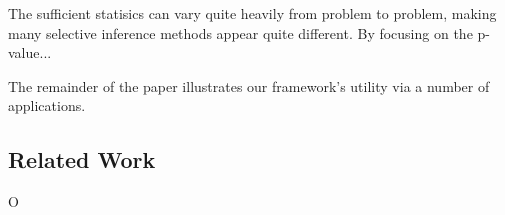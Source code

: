 \documentclass{article}
\begin{document}
The sufficient statisics can vary quite heavily from problem to problem, making many selective inference methods appear quite different. By focusing on the p-value... 

The remainder of the paper illustrates our framework's utility via a number of applications. 





\subsection{Related Work}


O%

\end{document}
